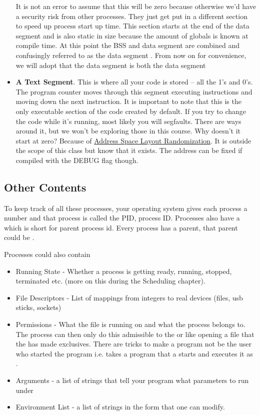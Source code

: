 \begin{itemize}
It is not an error to assume that this will be zero because otherwise we'd have a security risk from other processes.
They just get put in a different section to speed up process start up time.
This section starts at the end of the data segment and is also static in size because the amount of globals is known at compile time.
At this point the BSS and data segment are combined and confusingly referred to as the data segment \cite[P. 124]{van1994expert}.
From now on for convenience, we will adopt that the data segment is both the data segment

\item \textbf{A Text Segment}.
This is where all your code is stored -- all the 1's and 0's.
The program counter moves through this segment executing instructions and moving down the next instruction.
It is important to note that this is the only executable section of the code created by default.
If you try to change the code while it's running, most likely you will segfaults.
There are ways around it, but we won't be exploring those in this course.
Why doesn't it start at zero? Because of \href{https://en.wikipedia.org/wiki/Address_space_layout_randomization}{Address Space Layout Randomization}.
It is outside the scope of this class but know that it exists.
The address can be fixed if compiled with the DEBUG flag though.
\end{itemize}

\subsection{Other Contents}

To keep track of all these processes, your operating system gives each process a number and that process is called the PID, process ID.
Processes also have a  which is short for parent process id.
Every process has a parent, that parent could be .

Processes could also contain

\begin{itemize}
\item Running State - Whether a process is getting ready, running, stopped, terminated etc. (more on this during the Scheduling chapter).
\item File Descriptors - List of mappings from integers to real devices (files, usb sticks, sockets)
\item Permissions - What  the file is running on and what  the process belongs to.
  The process can then only do this admissible to the  or  like opening a file that the  has made exclusives.
  There are tricks to make a program not be the user who started the program i.e.  takes a program that a  starts and executes it as .
\item Arguments - a list of strings that tell your program what parameters to run under
\item Environment List - a list of strings in the form  that one can modify.
\end{itemize}

